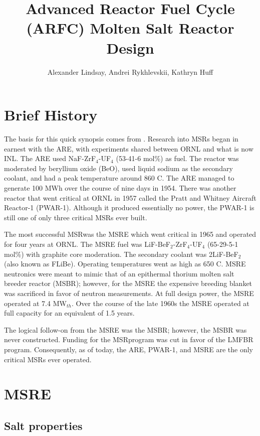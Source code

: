 \documentclass{article}
\title{Advanced Reactor Fuel Cycle (ARFC) Molten Salt Reactor Design}
\author{Alexander Lindsay, Andrei Rykhlevskii, Kathryn Huff} %
\let\Oldsection\section
\renewcommand{\section}{\FloatBarrier\Oldsection}
\let\Oldsubsection\subsection
\renewcommand{\subsection}{\FloatBarrier\Oldsubsection}
\begin{document}
\maketitle

\section{Brief History}

The basis for this quick synopsis comes from \cite{wikipedia_molten_2016}. 
Research into \glspl{MSR} began in earnest with the \gls{ARE}, with experiments 
shared between \gls{ORNL} and what is now \gls{INL}. The \gls{ARE} used 
NaF-ZrF$_4$-UF$_4$ (53-41-6 mol\%) as fuel. The reactor was moderated by 
beryllium oxide (BeO), used liquid sodium as the secondary coolant, and had a 
peak temperature around 860 \textdegree C. The \gls{ARE} managed to generate
100 MWh over the course of nine days in 1954. There was another reactor that
went critical at \gls{ORNL} in 1957 called the Pratt and Whitney Aircraft Reactor-1
(PWAR-1). Although it produced essentially no power, the PWAR-1 is still one of
only three critical MSRs ever built.

The most successful \gls{MSR}was the \gls{MSRE} which went
critical in 1965 and operated for four years at \gls{ORNL}. The \gls{MSRE} fuel was
LiF-BeF$_2$-ZrF$_4$-UF$_4$ (65-29-5-1 mol\%) with graphite core moderation. The
secondary coolant was 2LiF-BeF$_2$ (also known as FLiBe). Operating temperatures
went as high as 650 \textdegree C. \gls{MSRE} neutronics were meant to mimic that of
an epithermal thorium molten salt breeder reactor (MSBR); however, for the \gls{MSRE}
the expensive breeding blanket was sacrificed in favor of neutron
measurements. At full design power, the \gls{MSRE} operated at 7.4 MW$_{th}$. Over the
course of the late 1960s the \gls{MSRE} operated at full capacity for an equivalent of
1.5 years.

The logical follow-on from the \gls{MSRE} was the MSBR; however, the MSBR was never
constructed. Funding for the \gls{MSR}program was cut in favor of the
\gls{LMFBR} program. Consequently, as of today, the \gls{ARE},
PWAR-1, and \gls{MSRE} are the only critical MSRs ever operated.

\section{\gls{MSRE}}

\subsection{Salt properties}
\end{document}
